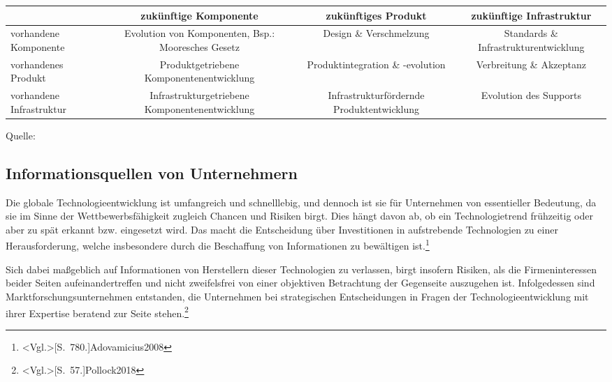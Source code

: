 \begin{center}
\label{tab:influence_path}
\begin{tabulary}{\textwidth}{|L|C|C|C|}
	\hline
	 & zukünftige Komponente & zukünftiges Produkt & zukünftige Infrastruktur \\ 
	\hline 
	vorhandene Komponente & Evolution von Komponenten, Bsp.: \newline Mooresches Gesetz & Design \& Verschmelzung & Standards \& Infrastruktur\-entwicklung \\ 
	\hline 
	vorhandenes Produkt & Produktgetriebene Komponenten\-entwicklung & Produktintegration \& -evolution & Verbreitung \& Akzeptanz \\ 
	\hline 
	vorhandene Infrastruktur & Infrastrukturgetriebene Komponenten\-entwicklung & Infrastruktur\-fördernde Produktentwicklung & Evolution des Supports \\ 
	\hline
\end{tabulary}\par
\smallskip
Quelle: 
\end{center}


%
%
%
%

\subsection{Informationsquellen von Unternehmern}
Die globale Technologieentwicklung ist umfangreich und schnelllebig, und dennoch ist sie für Unternehmen von essentieller Bedeutung, da sie im Sinne der Wettbewerbsfähigkeit zugleich Chancen und Risiken birgt. Dies hängt davon ab, ob ein Technologietrend frühzeitig oder aber zu spät erkannt bzw. eingesetzt wird. Das macht die Entscheidung über Investitionen in aufstrebende Technologien zu einer Herausforderung, welche insbesondere durch die Beschaffung von Informationen zu bewältigen ist.\footnote{\citeNP<Vgl.>[S.~780.]{Adovamicius2008}}

Sich dabei maßgeblich auf Informationen von Herstellern dieser Technologien zu verlassen, birgt insofern Risiken, als die Firmeninteressen beider Seiten aufeinandertreffen und nicht zweifelsfrei von einer objektiven Betrachtung der Gegenseite auszugehen ist. Infolgedessen sind Marktforschungsunternehmen entstanden, die Unternehmen bei strategischen Entscheidungen in Fragen der Technologieentwicklung mit ihrer Expertise beratend zur Seite stehen.\footnote{\citeNP<Vgl.>[S.~57.]{Pollock2018}}

